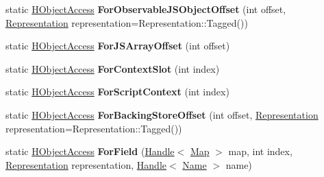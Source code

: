 \begin{DoxyCompactItemize}
\item 
static \hyperlink{classv8_1_1internal_1_1_h_object_access}{H\+Object\+Access} {\bfseries For\+Observable\+J\+S\+Object\+Offset} (int offset, \hyperlink{classv8_1_1internal_1_1_representation}{Representation} representation=Representation\+::\+Tagged())\hypertarget{classv8_1_1internal_1_1_h_object_access_a76a7bcda9cfc84f8e6814dba217d39f7}{}\label{classv8_1_1internal_1_1_h_object_access_a76a7bcda9cfc84f8e6814dba217d39f7}

\item 
static \hyperlink{classv8_1_1internal_1_1_h_object_access}{H\+Object\+Access} {\bfseries For\+J\+S\+Array\+Offset} (int offset)\hypertarget{classv8_1_1internal_1_1_h_object_access_a239d38ad81c6db658950c72bb92411a1}{}\label{classv8_1_1internal_1_1_h_object_access_a239d38ad81c6db658950c72bb92411a1}

\item 
static \hyperlink{classv8_1_1internal_1_1_h_object_access}{H\+Object\+Access} {\bfseries For\+Context\+Slot} (int index)\hypertarget{classv8_1_1internal_1_1_h_object_access_a2d8cfd688578cde876f92d21ba41b89d}{}\label{classv8_1_1internal_1_1_h_object_access_a2d8cfd688578cde876f92d21ba41b89d}

\item 
static \hyperlink{classv8_1_1internal_1_1_h_object_access}{H\+Object\+Access} {\bfseries For\+Script\+Context} (int index)\hypertarget{classv8_1_1internal_1_1_h_object_access_a5cf66c5402c88898deb2bbc0b54fb7ec}{}\label{classv8_1_1internal_1_1_h_object_access_a5cf66c5402c88898deb2bbc0b54fb7ec}

\item 
static \hyperlink{classv8_1_1internal_1_1_h_object_access}{H\+Object\+Access} {\bfseries For\+Backing\+Store\+Offset} (int offset, \hyperlink{classv8_1_1internal_1_1_representation}{Representation} representation=Representation\+::\+Tagged())\hypertarget{classv8_1_1internal_1_1_h_object_access_a25e48bdcbaae71703deecf51a753b23c}{}\label{classv8_1_1internal_1_1_h_object_access_a25e48bdcbaae71703deecf51a753b23c}

\item 
static \hyperlink{classv8_1_1internal_1_1_h_object_access}{H\+Object\+Access} {\bfseries For\+Field} (\hyperlink{classv8_1_1internal_1_1_handle}{Handle}$<$ \hyperlink{classv8_1_1internal_1_1_map}{Map} $>$ map, int index, \hyperlink{classv8_1_1internal_1_1_representation}{Representation} representation, \hyperlink{classv8_1_1internal_1_1_handle}{Handle}$<$ \hyperlink{classv8_1_1internal_1_1_name}{Name} $>$ name)\hypertarget{classv8_1_1internal_1_1_h_object_access_a454938aa73bd5b00bb48993b811103df}{}\label{classv8_1_1internal_1_1_h_object_access_a454938aa73bd5b00bb48993b811103df}


\end{DoxyCompactItemize}
